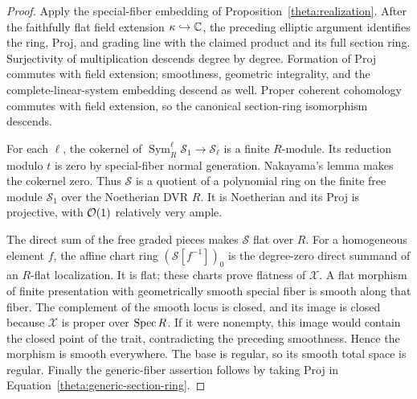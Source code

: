 \begin{proof}
Apply the special-fiber embedding of
Proposition~\ref{theta:realization}.  After the faithfully flat field
extension $\kappa\hookrightarrow\mathbb C$, the preceding elliptic argument
identifies the ring, Proj, and grading line with the claimed product
and its full section ring.  Surjectivity of multiplication descends
degree by degree.  Formation of Proj commutes with field extension;
smoothness, geometric integrality, and the complete-linear-system
embedding descend as well.  Proper coherent cohomology commutes with
field extension, so the canonical section-ring isomorphism descends.

For each $\ell$, the cokernel of
$\operatorname{Sym}^\ell_R\mathscr S_1\to\mathscr S_\ell$ is a finite
$R$-module.  Its reduction modulo $t$ is zero by special-fiber normal
generation.  Nakayama's lemma makes the cokernel zero.  Thus $\mathscr S$
is a quotient of a polynomial ring on the finite free module
$\mathscr S_1$ over the Noetherian DVR $R$.  It is Noetherian and its
Proj is projective, with $\mathcal O(1)$ relatively very ample.

The direct sum of the free graded pieces makes $\mathscr S$ flat over
$R$.  For a homogeneous element $f$, the affine chart ring
$(\mathscr S[f^{-1}])_0$ is the degree-zero direct summand of an
$R$-flat localization.  It is flat; these charts prove flatness of
$\mathscr X$.  A flat morphism of finite presentation with geometrically
smooth special fiber is smooth along that fiber.  The complement of
the smooth locus is closed, and its image is closed because $\mathscr X$
is proper over $\operatorname{Spec} R$.  If it were nonempty, this image would contain
the closed point of the trait, contradicting the preceding smoothness.
Hence the morphism is smooth everywhere.  The base is regular, so its
smooth total space is regular.  Finally the generic-fiber assertion
follows by taking Proj in Equation~\eqref{theta:generic-section-ring}.
\end{proof}

